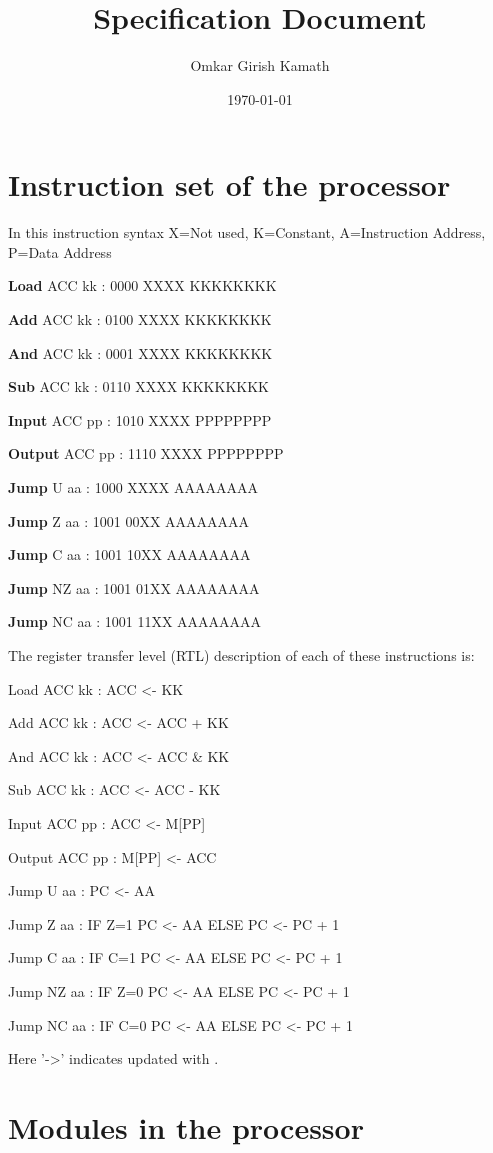 \documentclass[11pt]{article}
\author{Omkar Girish Kamath}
\date{\today}
\title{Specification Document}
\begin{document}
\maketitle
\tableofcontents

\section{Instruction set of the processor}
\label{sec:org0bd2aa9}

In this instruction syntax X=Not used, K=Constant, A=Instruction Address, P=Data Address

\textbf{Load} ACC kk : 0000 XXXX KKKKKKKK

\textbf{Add} ACC kk : 0100 XXXX KKKKKKKK

\textbf{And} ACC kk : 0001 XXXX KKKKKKKK

\textbf{Sub} ACC kk : 0110 XXXX KKKKKKKK

\textbf{Input} ACC pp : 1010 XXXX PPPPPPPP

\textbf{Output} ACC pp : 1110 XXXX PPPPPPPP

\textbf{Jump} U aa : 1000 XXXX AAAAAAAA

\textbf{Jump} Z aa : 1001 00XX AAAAAAAA

\textbf{Jump} C aa : 1001 10XX AAAAAAAA

\textbf{Jump} NZ aa : 1001 01XX AAAAAAAA

\textbf{Jump} NC aa : 1001 11XX AAAAAAAA

The register transfer level (RTL) description of each of these instructions is:

Load ACC kk : ACC <- KK

Add ACC kk : ACC <- ACC + KK

And ACC kk : ACC <- ACC \& KK

Sub ACC kk : ACC <- ACC - KK

Input ACC pp : ACC <- M[PP]

Output ACC pp : M[PP] <- ACC

Jump U aa : PC <- AA

Jump Z aa : IF Z=1 PC <- AA ELSE PC <- PC + 1

Jump C aa : IF C=1 PC <- AA ELSE PC <- PC + 1

Jump NZ aa : IF Z=0 PC <- AA ELSE PC <- PC + 1

Jump NC aa : IF C=0 PC <- AA ELSE PC <- PC + 1

Here '->' indicates updated with .
\section{Modules in the processor}
\label{sec:orgf06bb92}
\end{document}
